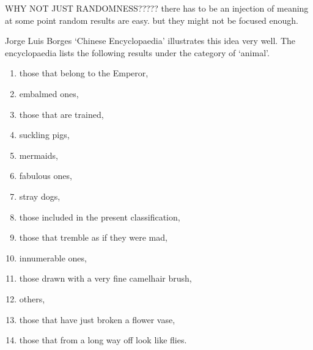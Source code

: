 WHY NOT JUST RANDOMNESS?????
there has to be an injection of meaning at some point
random results are easy. but they might not be focused enough.

%
%

Jorge Luis Borges `Chinese Encyclopaedia' \autocite{Borges2000} illustrates this idea very well. The encyclopaedia lists the following results under the category of `animal'.

\begin{enumerate}
  \item those that belong to the Emperor,
  \item embalmed ones,
  \item those that are trained,
  \item suckling pigs,
  \item mermaids,
  \item fabulous ones,
  \item stray dogs,
  \item those included in the present classification,
  \item those that tremble as if they were mad,
  \item innumerable ones,
  \item those drawn with a very fine camelhair brush,
  \item others,
  \item those that have just broken a flower vase,
  \item those that from a long way off look like flies.
\end{enumerate}

